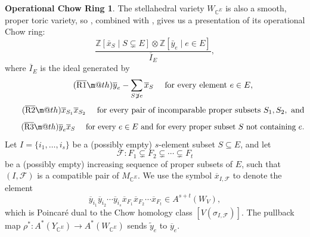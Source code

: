 \documentclass{amsart}
\makeatletter
\theoremstyle{plain}
\theoremstyle{definition}
\newtheorem{opchowring}[theorem]{Operational Chow Ring}
\newcommand*{\textoverline}[1]{$\overline{\hbox{#1}}\m@th$}
\makeatother
\begin{document}
\begin{opchowring}
The stellahedral variety $W_{\mathbb{C}^E}$ is also a smooth, proper toric variety, so \cite[Theorem 10.8]{danilov}, combined with \cite[Corollary 3.14]{stellahedral}, gives us a presentation of its operational Chow ring:
\begin{equation*}
\frac{\mathbb{Z}[\bar{x}_S \mid S \subsetneq E] \otimes \mathbb{Z} [\bar{y}_e \mid e \in E]    }{\overline{I}_E},
\end{equation*}
where $\overline{I}_E$ is the ideal generated by
\begin{equation}
\label{eq:stella_ideal_description_1}
\tag{\textoverline{R1}}
\overline{y}_e - \sum_{S\not\ni e}\overline{x}_S \quad \text{ for every element } e \in E,
\end{equation}
\begin{equation}
\label{eq:stella_ideal_description_2}
\tag{\textoverline{R2}}
\overline{x}_{S_1}\overline{x}_{S_2} \quad \text{ for every pair of incomparable proper subsets } S_1, S_2, \text{ and}
\end{equation}
\begin{equation}
\label{eq:stella_ideal_description_3}
\tag{\textoverline{R3}}
\overline{y}_e\overline{x}_S \quad \text{ for every $e \in E$ and for every proper subset $S$ not containing $e$.}
\end{equation}
Let $I = \{i_1,\dots,i_s\}$ be a (possibly empty) $s$-element subset $S\subseteq E$, and let 
\[\mathscr{F}:F_{1} \subsetneq F_{2} \subsetneq \cdots \subsetneq F_{t}\]
be a (possibly empty) increasing sequence of proper subsets of $E$, such that $(I, \mathscr{F})$ is a compatible pair of $M_{\mathbb{C}^E}.$ We use the symbol $\overline{x}_{I, \mathscr{F}}$ to denote the element
\[\overline{y}_{i_1}\overline{y}_{i_2}\cdots \overline{y}_{i_s} \overline{x}_{F_1}\overline{x}_{F_2}\cdots \overline{x}_{F_t} \in A^{s+t}(W_V),\]
which is Poincar\'e dual to the Chow homology class $[V(\sigma_{I, \mathscr{F}})].$ The pullback map ${\rho}^*: A^*(Y_{\mathbb{C}^E}) \to A^*(W_{\mathbb{C}^E})$ sends $\tilde{y}_e$ to $\overline{y}_e$.
\end{opchowring}
\end{document}
